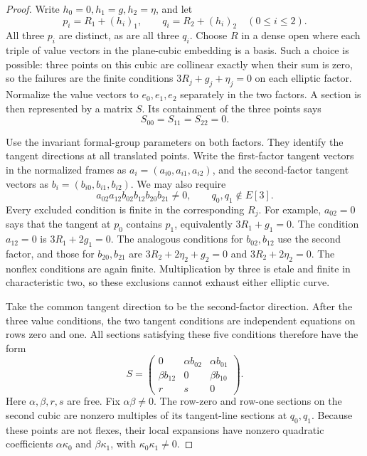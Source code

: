 \begin{proof}
Write $h_0=0,h_1=g,h_2=\eta$, and let
\[
                    p_i=R_1+(h_i)_1,\qquad
                    q_i=R_2+(h_i)_2
                    \quad(0\le i\le2).
\]
All three $p_i$ are distinct, as are all three $q_i$.
Choose $R$ in a dense open where each triple of value vectors
in the plane-cubic embedding is a basis.
Such a choice is possible: three points on this cubic are
collinear exactly when their sum is zero, so the failures are
the finite conditions $3R_j+g_j+\eta_j=0$ on each elliptic factor.
Normalize the value vectors to $e_0,e_1,e_2$ separately in the two
factors.  A section is then represented by a matrix $S$.
Its containment of the three points says
\[
                             S_{00}=S_{11}=S_{22}=0.
\]

Use the invariant formal-group parameters on both factors.
They identify the tangent directions at all translated points.
Write the first-factor tangent vectors in the normalized frames as
$a_i=(a_{i0},a_{i1},a_{i2})$, and the second-factor tangent vectors
as $b_i=(b_{i0},b_{i1},b_{i2})$.
We may also require
\[
             a_{02}a_{12}b_{02}b_{12}b_{20}b_{21}\ne0,
             \qquad q_0,q_1\notin E[3].
\]
Every excluded condition is finite in the corresponding $R_j$.
For example, $a_{02}=0$ says that the tangent at $p_0$ contains
$p_1$, equivalently $3R_1+g_1=0$.
The condition $a_{12}=0$ is $3R_1+2g_1=0$.
The analogous conditions for $b_{02},b_{12}$ use the second
factor, and those for $b_{20},b_{21}$ are
$3R_2+2\eta_2+g_2=0$ and $3R_2+2\eta_2=0$.
The nonflex conditions are again finite.  Multiplication by three
is etale and finite in characteristic two, so these exclusions
cannot exhaust either elliptic curve.

Take the common tangent direction to be the second-factor direction.
After the three value conditions, the two tangent conditions
are independent equations on rows zero and one.
All sections satisfying these five conditions therefore have the
form
\[
 S=
 \begin{pmatrix}
       0&\alpha b_{02}&\alpha b_{01}\\
       \beta b_{12}&0&\beta b_{10}\\
       r&s&0
 \end{pmatrix}.

\]
Here $\alpha,\beta,r,s$ are free.  Fix $\alpha\beta\ne0$.
The row-zero and row-one sections on the second cubic are
nonzero multiples of its tangent-line sections at $q_0,q_1$.
Because these points are not flexes, their local expansions have
nonzero quadratic coefficients $\alpha\kappa_0$ and
$\beta\kappa_1$, with $\kappa_0\kappa_1\ne0$.


\end{proof}
